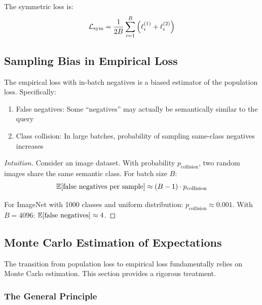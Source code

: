 \begin{notechapter}
\begin{definition}
The symmetric loss is:
\begin{equation}
\mathcal{L}_{\text{sym}} = \frac{1}{2B} \sum_{i=1}^{B} \left(\ell_i^{(1)} + \ell_i^{(2)}\right)
\end{equation}
\end{definition}

\subsection{Sampling Bias in Empirical Loss}

\begin{proposition}
The empirical loss with in-batch negatives is a biased estimator of the population loss. Specifically:
\begin{enumerate}[label=(\roman*)]
    \item False negatives: Some ``negatives'' may actually be semantically similar to the query
    \item Class collision: In large batches, probability of sampling same-class negatives increases
\end{enumerate}
\end{proposition}

\begin{proof}[Intuition]
Consider an image dataset. With probability $p_{\text{collision}}$, two random images share the same semantic class. For batch size $B$:
\begin{equation}
\mathbb{E}[\text{false negatives per sample}] \approx (B-1) \cdot p_{\text{collision}}
\end{equation}

For ImageNet with 1000 classes and uniform distribution: $p_{\text{collision}} \approx 0.001$. With $B = 4096$: $\mathbb{E}[\text{false negatives}] \approx 4$.
\end{proof}

\subsection{Monte Carlo Estimation of Expectations}

The transition from population loss to empirical loss fundamentally relies on Monte Carlo estimation. This section provides a rigorous treatment.

\subsubsection{The General Principle}


\end{notechapter}
